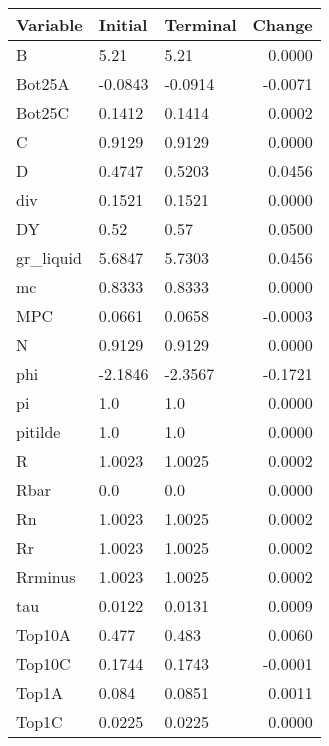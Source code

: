 \begin{table}
\centering
\label{tab:stst_comparison_low_beta_limit_permanent_asymmetric}
\begin{tabular}{lllr}
\toprule
                Variable & Initial & Terminal &  Change \\
\midrule
                       B &    5.21 &     5.21 &  0.0000 \\
                  Bot25A & -0.0843 &  -0.0914 & -0.0071 \\
                  Bot25C &  0.1412 &   0.1414 &  0.0002 \\
                       C &  0.9129 &   0.9129 &  0.0000 \\
                       D &  0.4747 &   0.5203 &  0.0456 \\
                     div &  0.1521 &   0.1521 &  0.0000 \\
                      DY &    0.52 &     0.57 &  0.0500 \\
               gr\_liquid &  5.6847 &   5.7303 &  0.0456 \\
                      mc &  0.8333 &   0.8333 &  0.0000 \\
                     MPC &  0.0661 &   0.0658 & -0.0003 \\
                       N &  0.9129 &   0.9129 &  0.0000 \\
                     phi & -2.1846 &  -2.3567 & -0.1721 \\
                      pi &     1.0 &      1.0 &  0.0000 \\
                 pitilde &     1.0 &      1.0 &  0.0000 \\
                       R &  1.0023 &   1.0025 &  0.0002 \\
                    Rbar &     0.0 &      0.0 &  0.0000 \\
                      Rn &  1.0023 &   1.0025 &  0.0002 \\
                      Rr &  1.0023 &   1.0025 &  0.0002 \\
                 Rrminus &  1.0023 &   1.0025 &  0.0002 \\
                     tau &  0.0122 &   0.0131 &  0.0009 \\
                  Top10A &   0.477 &    0.483 &  0.0060 \\
                  Top10C &  0.1744 &   0.1743 & -0.0001 \\
                   Top1A &   0.084 &   0.0851 &  0.0011 \\
                   Top1C &  0.0225 &   0.0225 &  0.0000 \\

\end{tabular}
\end{table}
